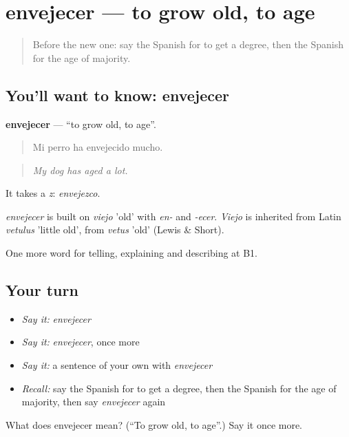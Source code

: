 \section[envejecer]{envejecer — to grow old, to age}

\label{lesson:ES-C554-envejecer}



\begin{quote}
Before the new one: say the Spanish for to get a degree, then the Spanish for the age of majority.
\end{quote}

\subsection*{You'll want to know: envejecer}
\textbf{envejecer} — \textquotedblleft{}to grow old, to age\textquotedblright{}.

\begin{quote}
Mi perro ha envejecido mucho.
\end{quote}

\begin{quote}
\emph{My dog has aged a lot.}
\end{quote}

It takes a \emph{z}: \emph{envejezco}.

\begin{cousinweb}
\emph{envejecer} is built on \emph{viejo} 'old' with \emph{en-} and \emph{-ecer}. \emph{Viejo} is inherited from Latin \emph{vetulus} 'little old', from \emph{vetus} 'old' (Lewis \& Short).
\end{cousinweb}

\begin{grammarlens}[title={What you've built}]
One more word for telling, explaining and describing at B1.
\end{grammarlens}

\subsection*{Your turn}
\begin{itemize}
\raggedright
  \item \emph{Say it:} \emph{envejecer}
  \item \emph{Say it:} \emph{envejecer}, once more
  \item \emph{Say it:} a sentence of your own with \emph{envejecer}
  \item \emph{Recall:} say the Spanish for to get a degree, then the Spanish for the age of majority, then say \emph{envejecer} again
\end{itemize}

\begin{tcolorbox}[breakable,colback=teal!4,colframe=teal!35!black,title={Before you move on}]
What does envejecer mean? (\textquotedblleft{}To grow old, to age\textquotedblright{}.) Say it once more.
\end{tcolorbox}
